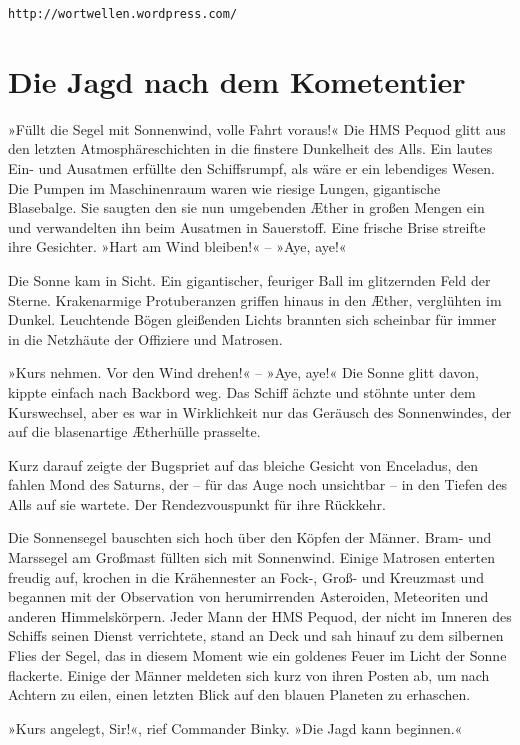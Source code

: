 \texttt{http://wortwellen.wordpress.com/}

\newpage

\section{Die Jagd nach dem Kometentier}

»Füllt die Segel mit Sonnenwind, volle Fahrt voraus!« Die HMS
Pequod glitt aus den letzten Atmosphäreschichten in die finstere
Dunkelheit des Alls. Ein lautes Ein- und Ausatmen erfüllte den
Schiffsrumpf, als wäre er ein lebendiges Wesen. Die Pumpen im
Maschinenraum waren wie riesige Lungen, gigantische Blasebalge. Sie
saugten den sie nun umgebenden Æther in großen Mengen ein und
verwandelten ihn beim Ausatmen in Sauerstoff. Eine frische Brise
streifte ihre Gesichter. »Hart am Wind bleiben!« – »Aye, aye!«

Die Sonne kam in Sicht. Ein gigantischer, feuriger Ball im
glitzernden Feld der Sterne. Krakenarmige Protuberanzen griffen
hinaus in den Æther, verglühten im Dunkel. Leuchtende Bögen
gleißenden Lichts brannten sich scheinbar für immer in die
Netzhäute der Offiziere und Matrosen.

»Kurs nehmen. Vor den Wind drehen!« – »Aye, aye!« Die Sonne glitt
davon, kippte einfach nach Backbord weg. Das Schiff ächzte und
stöhnte unter dem Kurswechsel, aber es war in Wirklichkeit nur das
Geräusch des Sonnenwindes, der auf die blasenartige Ætherhülle
prasselte.

Kurz darauf zeigte der Bugspriet auf das bleiche Gesicht von
Enceladus, den fahlen Mond des Saturns, der – für das Auge noch
unsichtbar – in den Tiefen des Alls auf sie wartete. Der
Rendezvouspunkt für ihre Rückkehr.

Die Sonnensegel bauschten sich hoch über den Köpfen der Männer.
Bram- und Marssegel am Großmast füllten sich mit Sonnenwind. Einige
Matrosen enterten freudig auf, krochen in die Krähennester an
Fock-, Groß- und Kreuzmast und begannen mit der Observation von
herumirrenden Asteroiden, Meteoriten und anderen Himmelskörpern.
Jeder Mann der HMS Pequod, der nicht im Inneren des Schiffs seinen
Dienst verrichtete, stand an Deck und sah hinauf zu dem silbernen
Flies der Segel, das in diesem Moment wie ein goldenes Feuer im
Licht der Sonne flackerte. Einige der Männer meldeten sich kurz von
ihren Posten ab, um nach Achtern zu eilen, einen letzten Blick auf
den blauen Planeten zu erhaschen.

»Kurs angelegt, Sir!«, rief Commander Binky. »Die Jagd kann
beginnen.«


